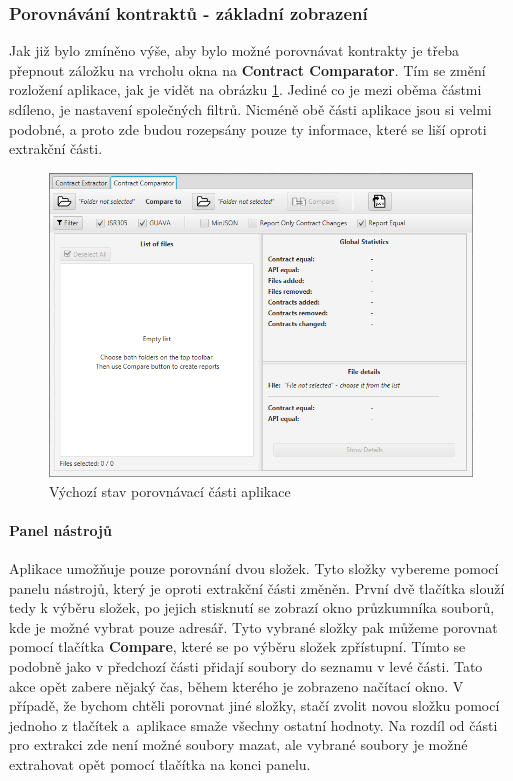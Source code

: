 	
	\subsubsection{Porovnávání kontraktů - základní zobrazení}
		Jak již bylo zmíněno výše, aby bylo možné porovnávat kontrakty je třeba přepnout záložku na vrcholu okna na \textbf{Contract Comparator}. Tím se změní rozložení aplikace, jak je vidět na obrázku \ref{guide06}. Jediné co je mezi oběma částmi sdíleno, je nastavení společných filtrů. Nicméně obě části aplikace jsou si velmi podobné, a proto zde budou rozepsány pouze ty informace, které se liší oproti extrakční části.
		
			\begin{figure}[!htb]
					\centering
					\includegraphics[width=1\textwidth]{img/guide06.png}
					\caption[guide06]{Výchozí stav porovnávací části aplikace}
					\label{guide06}
				\endminipage\hfill
			\end{figure}
		
		\paragraph{Panel nástrojů}	
			Aplikace umožňuje pouze porovnání dvou složek. Tyto složky vybereme pomocí panelu nástrojů, který je oproti extrakční části změněn. První dvě tlačítka slouží tedy k výběru složek, po jejich stisknutí se zobrazí okno průzkumníka souborů, kde je možné vybrat pouze adresář. Tyto vybrané složky pak můžeme porovnat pomocí tlačítka \textbf{Compare}, které se po výběru složek zpřístupní. Tímto se podobně jako v předchozí části přidají soubory do seznamu v levé části. Tato akce opět zabere nějaký čas, během kterého je zobrazeno načítací okno. V případě, že bychom chtěli porovnat jiné složky, stačí zvolit novou složku pomocí jednoho z tlačítek a~aplikace smaže všechny ostatní hodnoty. Na rozdíl od části pro extrakci zde není možné soubory mazat, ale vybrané soubory je možné extrahovat opět pomocí tlačítka na konci panelu.\\
		

